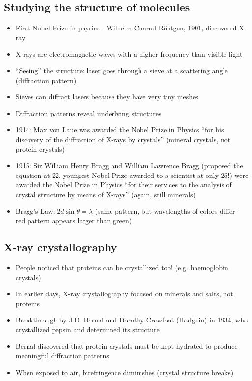 \documentclass[letterpaper, 12pt]{article}
\begin{document}
\subsection*{Studying the structure of molecules}
\begin{itemize}
\item First Nobel Prize in physics - Wilhelm Conrad Röntgen, 1901, discovered X-ray
\item X-rays are electromagnetic waves with a higher frequency than visible light
\item ``Seeing'' the structure: laser goes through a sieve at a scattering angle (diffraction pattern)
\item Sieves can diffract lasers because they have very tiny meshes
\item Diffraction patterns reveal underlying structures
\item 1914: Max von Laue was awarded the Nobel Prize in Physics ``for his discovery of the diffraction of X-rays by crystals'' (mineral crystals, not protein crystals)
\item 1915: Sir William Henry Bragg and William Lawrence Bragg (proposed the equation at 22, youngest Nobel Prize awarded to a scientist at only 25!) were awarded the Nobel Prize in Physics ``for their services to the analysis of crystal structure by means of X-rays'' (again, still minerals)
\item Bragg's Law: $2d\sin\theta = \lambda$ (same pattern, but wavelengths of colors differ - red pattern appears larger than green)
\end{itemize}

\subsection*{X-ray crystallography}
\begin{itemize}
\item People noticed that proteins can be crystallized too! (e.g. haemoglobin crystals)
\item In earlier days, X-ray crystallography focused on minerals and salts, not proteins
\item Breakthrough by J.D. Bernal and Dorothy Crowfoot (Hodgkin) in 1934, who crystallized pepsin and determined its structure
\item Bernal discovered that protein crystals must be kept hydrated to produce meaningful diffraction patterns
\item When exposed to air, birefringence diminishes (crystal structure breaks)
\end{itemize}
\end{document}

